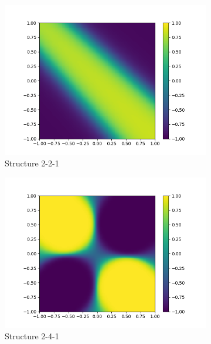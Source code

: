 \begin{figure}[h!]
  \centering
  \begin{subfigure}[b]{.3\linewidth}
    \includegraphics[width=\linewidth]{fig/xor221_eta009.png}
    \caption{Structure 2-2-1}
    \label{fig:struct221}
  \end{subfigure}
  \quad
  \begin{subfigure}[b]{.3\linewidth}
    \includegraphics[width=\linewidth]{fig/xor241_eta016.png}
    \caption{Structure 2-4-1}
    \label{fig:struct241}
  \end{subfigure}
  \quad
  \begin{subfigure}[b]{.3\linewidth}

\end{subfigure}
\end{figure}
